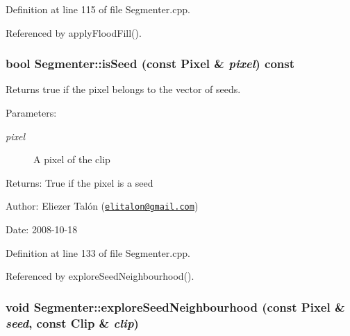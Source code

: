 Definition at line 115 of file Segmenter.cpp.

Referenced by applyFloodFill().\hypertarget{class_segmenter_eb86d455481f794cb4870eba98ee4340}{
\subsubsection[isSeed]{\setlength{\rightskip}{0pt plus 5cm}bool Segmenter::isSeed (const {\bf Pixel} \& {\em pixel}) const}}
\label{class_segmenter_eb86d455481f794cb4870eba98ee4340}


Returns true if the pixel belongs to the vector of seeds. 

\begin{Desc}
\item[Parameters:]
\begin{description}
\item[{\em pixel}]A pixel of the clip\end{description}
\end{Desc}
\begin{Desc}
\item[Returns:]True if the pixel is a seed\end{Desc}
\begin{Desc}
\item[Author:]Eliezer Talón (\href{mailto:elitalon@gmail.com}{\tt elitalon@gmail.com}) \end{Desc}
\begin{Desc}
\item[Date:]2008-10-18 \end{Desc}


Definition at line 133 of file Segmenter.cpp.

Referenced by exploreSeedNeighbourhood().\hypertarget{class_segmenter_684df74b0e810a837669823c47b6ed87}{
\subsubsection[exploreSeedNeighbourhood]{\setlength{\rightskip}{0pt plus 5cm}void Segmenter::exploreSeedNeighbourhood (const {\bf Pixel} \& {\em seed}, \/  const {\bf Clip} \& {\em clip})}}
\label{class_segmenter_684df74b0e810a837669823c47b6ed87}


